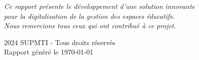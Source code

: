 \documentclass[12pt, a4paper, twoside, openany]{report}
\begin{document}
\begin{center}
    \vspace{1.2cm}
    
    \begin{minipage}{0.8\textwidth}
        \centering
        \small
        \textit{Ce rapport présente le développement d'une solution innovante \\
        pour la digitalisation de la gestion des espaces éducatifs. \\[0.3cm]
        Nous remercions tous ceux qui ont contribué à ce projet.}
    \end{minipage}
    
    \vspace{1cm}
    
    {\footnotesize\color{gray} 
        \textcopyright{} 2024 SUPMTI - Tous droits réservés \\
        Rapport généré le \today}
    
\end{center}

\vspace*{\fill}
\end{document}
